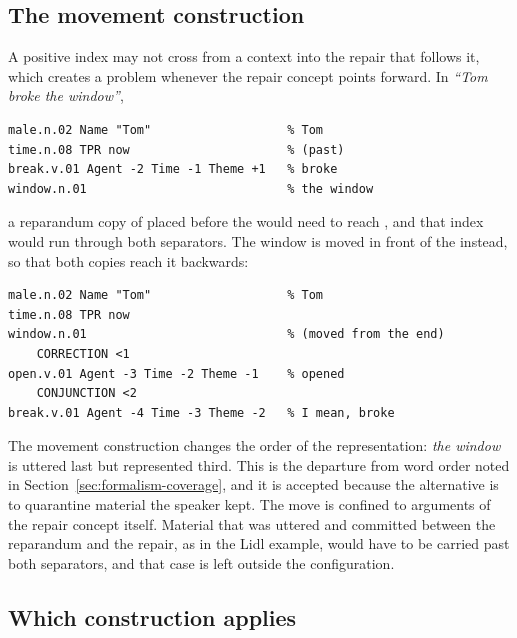 \documentclass{article}
\begin{document}
\subsection{The movement construction}
\label{app:devices-movement}

A positive index may not cross from a  context into the
repair that follows it, which creates a problem whenever the repair concept
points forward. In \textit{``Tom broke the window''},

\begin{lstlisting}[style=sbn]
male.n.02 Name "Tom"                   % Tom
time.n.08 TPR now                      % (past)
break.v.01 Agent -2 Time -1 Theme +1   % broke
window.n.01                            % the window
\end{lstlisting}

\noindent a reparandum copy of  placed before the
 would need  to reach
, and that index would run through both separators. The
window is moved in front of the  instead, so that both
copies reach it backwards:

\begin{lstlisting}[style=sbn]
male.n.02 Name "Tom"                   % Tom
time.n.08 TPR now
window.n.01                            % (moved from the end)
    CORRECTION <1
open.v.01 Agent -3 Time -2 Theme -1    % opened
    CONJUNCTION <2
break.v.01 Agent -4 Time -3 Theme -2   % I mean, broke
\end{lstlisting}

The movement construction changes the order of the representation:
\textit{the window} is uttered last but represented third. This is the
departure from word order noted in
Section~\ref{sec:formalism-coverage}, and it is accepted because the
alternative is to quarantine material the speaker kept. The move is confined to
arguments of the repair concept itself. Material that was uttered and
committed between the reparandum and the repair, as in the Lidl example, would
have to be carried past both separators, and that case is left outside the
configuration.

\subsection{Which construction applies}
\label{app:devices-order}
\end{document}
